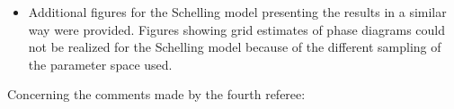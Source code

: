 \documentclass[11pt,a4paper,sans]{moderncv}        %
\begin{document}
\begin{itemize}
	\item Additional figures for the Schelling model presenting the results in a similar way were provided. Figures showing grid estimates of phase diagrams could not be realized for the Schelling model because of the different sampling of the parameter space used.
\end{itemize}



 
Concerning the comments made by the fourth referee:
\end{document}
